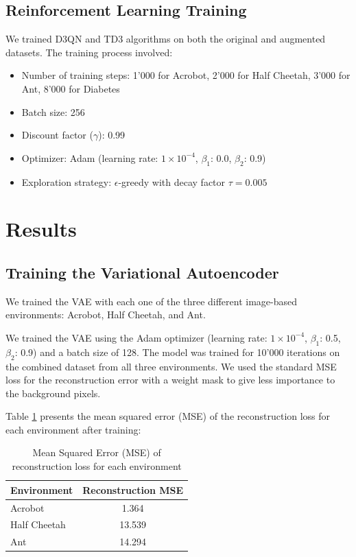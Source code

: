 \subsection{Reinforcement Learning Training}

We trained D3QN and TD3 algorithms on both the original and augmented datasets.
The training process involved:

\begin{itemize}
    \item Number of training steps: 1'000 for Acrobot, 2'000 for Half Cheetah, 3'000 for Ant, 8'000 for Diabetes
    \item Batch size: 256
    \item Discount factor ($\gamma$): 0.99
    \item Optimizer: Adam (learning rate: $1\times 10^{-4}$, $\beta_1$: 0.0, $\beta_2$: 0.9)
    \item Exploration strategy: $\epsilon$-greedy with decay factor $\tau = 0.005$
\end{itemize}

\section{Results}

\subsection{Training the Variational Autoencoder}

We trained the VAE with each one of the three different image-based
environments: Acrobot, Half Cheetah, and Ant.

We trained the VAE using the Adam optimizer (learning rate: $1\times 10^{-4}$, $\beta_1$: 0.5, $\beta_2$: 0.9)
and a batch size of 128. The model was trained for 10'000 iterations
on the combined dataset from all three environments. We used the standard
MSE loss for the reconstruction error with a weight mask
to give less importance to the background pixels.


Table \ref{tab:reconstruction_mse} presents the mean squared error (MSE) of the reconstruction loss for each environment after training:

\begin{table}[h]
    \centering
    \begin{tabular}{|l|c|}
        \hline
        \textbf{Environment} & \textbf{Reconstruction MSE} \\
        \hline
        Acrobot     & 1.364 \\
        Half Cheetah & 13.539 \\
        Ant         & 14.294 \\
        \hline
    \end{tabular}
    \caption{Mean Squared Error (MSE) of reconstruction loss for each environment}
    \label{tab:reconstruction_mse}
\end{table}

